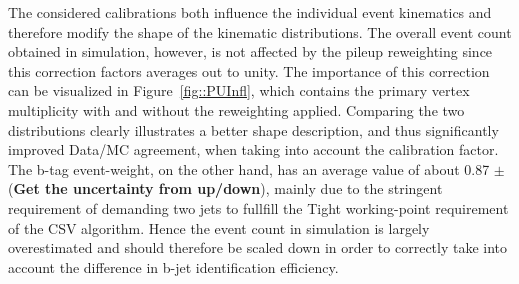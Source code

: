 The considered calibrations both influence the individual event kinematics and therefore modify the shape of the kinematic distributions.
The overall event count obtained in simulation, however, is not affected by the pileup reweighting since this correction factors averages out to unity.
The importance of this correction can be visualized in Figure~\ref{fig::PUInfl}, which contains the primary vertex multiplicity with and without the reweighting applied.
Comparing the two distributions clearly illustrates a better shape description, and thus significantly improved Data/MC agreement, when taking into account the calibration factor.
\\
The b-tag event-weight, on the other hand, has an average value of about 0.87 $\pm$  (\textbf{Get the uncertainty from up/down}), mainly due to the stringent requirement of demanding two jets to fullfill the Tight working-point requirement of the CSV algorithm.
Hence the event count in simulation is largely overestimated and should therefore be scaled down in order to correctly take into account the difference in b-jet identification efficiency.
%
%

